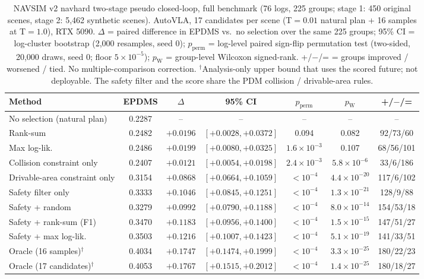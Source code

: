 \begin{table}[t]
\centering
\small
\caption{NAVSIM v2 navhard two-stage pseudo closed-loop, full benchmark (76 logs, 225 groups; stage 1: 450 original scenes, stage 2: 5{,}462 synthetic scenes). AutoVLA, 17 candidates per scene (T$=0.01$ natural plan + 16 samples at T$=1.0$), RTX 5090. $\Delta$ = paired difference in EPDMS vs.\ no selection over the same 225 groups; 95\% CI = log-cluster bootstrap (2{,}000 resamples, seed 0); $p_\text{perm}$ = log-level paired sign-flip permutation test (two-sided, 20{,}000 draws, seed 0; floor $5\times10^{-5}$); $p_\text{W}$ = group-level Wilcoxon signed-rank. +/$-$/= = groups improved / worsened / tied. No multiple-comparison correction. $^\dagger$Analysis-only upper bound that uses the scored future; not deployable. The safety filter and the score share the PDM collision / drivable-area rules.}
\label{tab:navhard}
\begin{tabular}{lcccccc}
\toprule
Method & EPDMS & $\Delta$ & 95\% CI & $p_\text{perm}$ & $p_\text{W}$ & +/$-$/= \\
\midrule
No selection (natural plan) & 0.2287 & -- & -- & -- & -- & -- \\
Rank-sum & 0.2482 & $+0.0196$ & $[+0.0028, +0.0372]$ & 0.094 & 0.082 & 92/73/60 \\
Max log-lik. & 0.2486 & $+0.0199$ & $[+0.0080, +0.0325]$ & $1.6\times10^{-3}$ & 0.107 & 68/56/101 \\
\midrule
Collision constraint only & 0.2407 & $+0.0121$ & $[+0.0054, +0.0198]$ & $2.4\times10^{-3}$ & $5.8\times10^{-6}$ & 33/6/186 \\
Drivable-area constraint only & 0.3154 & $+0.0868$ & $[+0.0664, +0.1059]$ & $<10^{-4}$ & $4.4\times10^{-20}$ & 117/6/102 \\
Safety filter only & 0.3333 & $+0.1046$ & $[+0.0845, +0.1251]$ & $<10^{-4}$ & $1.3\times10^{-21}$ & 128/9/88 \\
Safety + random & 0.3279 & $+0.0992$ & $[+0.0790, +0.1188]$ & $<10^{-4}$ & $8.0\times10^{-14}$ & 154/53/18 \\
Safety + rank-sum (F1) & 0.3470 & $+0.1183$ & $[+0.0956, +0.1400]$ & $<10^{-4}$ & $1.5\times10^{-15}$ & 147/51/27 \\
Safety + max log-lik. & 0.3503 & $+0.1216$ & $[+0.1007, +0.1423]$ & $<10^{-4}$ & $5.1\times10^{-19}$ & 141/33/51 \\
\midrule
Oracle (16 samples)$^\dagger$ & 0.4034 & $+0.1747$ & $[+0.1474, +0.1999]$ & $<10^{-4}$ & $3.3\times10^{-25}$ & 180/22/23 \\
Oracle (17 candidates)$^\dagger$ & 0.4053 & $+0.1767$ & $[+0.1515, +0.2012]$ & $<10^{-4}$ & $1.4\times10^{-25}$ & 180/18/27 \\
\bottomrule
\end{tabular}
\end{table}
